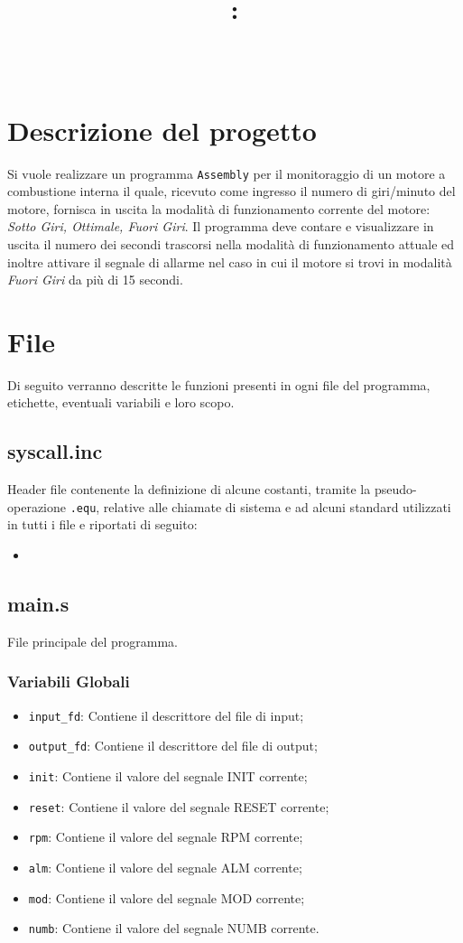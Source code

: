 \documentclass[a4paper,11pt]{article}
\title{
\vspace{2in}
\textmd{\textbf{\hmwkClass:\\ \hmwkTitle}}\\
\vspace{0.1in}\large{\textit{\hmwkAuthorName}}
\vspace{3in}
}
\newcommand{\Assembly}{\texttt{Assembly} }
\begin{document}
	\maketitle
	\newpage
	\tableofcontents
	\newpage
	
	\section{Descrizione del progetto}
	Si vuole realizzare un programma \Assembly per il monitoraggio di un motore a combustione interna il quale, ricevuto come ingresso il numero di giri/minuto del motore, fornisca in uscita la modalità di funzionamento corrente del motore: \textit{Sotto Giri, Ottimale, Fuori Giri}. Il programma deve contare e visualizzare in uscita il numero dei secondi trascorsi nella modalità di funzionamento attuale ed inoltre attivare il segnale di allarme nel caso in cui il motore si trovi in modalità \textit{Fuori Giri} da più di 15 secondi.
	
	
	\section{File}
	Di seguito verranno descritte le funzioni presenti in ogni file del programma, etichette, eventuali variabili e loro scopo. 
	
	\subsection{syscall.inc}
	Header file contenente la definizione di alcune costanti, tramite la pseudo-operazione \texttt{.equ}, relative alle chiamate di sistema e ad alcuni standard utilizzati in tutti i file e riportati di seguito:
	\begin{itemize}
		\item 
	\end{itemize}
	\subsection{main.s}
	File principale del programma. 
		\subsubsection{Variabili Globali}
		\begin{itemize}
			\item \texttt{input\_fd}: Contiene il descrittore del file di input;
			\item \texttt{output\_fd}: Contiene il descrittore del file di output;
			\item \texttt{init}: Contiene il valore del segnale INIT corrente;
			\item \texttt{reset}: Contiene il valore del segnale RESET corrente;
			\item \texttt{rpm}: Contiene il valore del segnale RPM corrente;
			\item \texttt{alm}: Contiene il valore del segnale ALM corrente;
			\item \texttt{mod}: Contiene il valore del segnale MOD corrente;
			\item \texttt{numb}: Contiene il valore del segnale NUMB corrente.
		\end{itemize}
\end{document}
